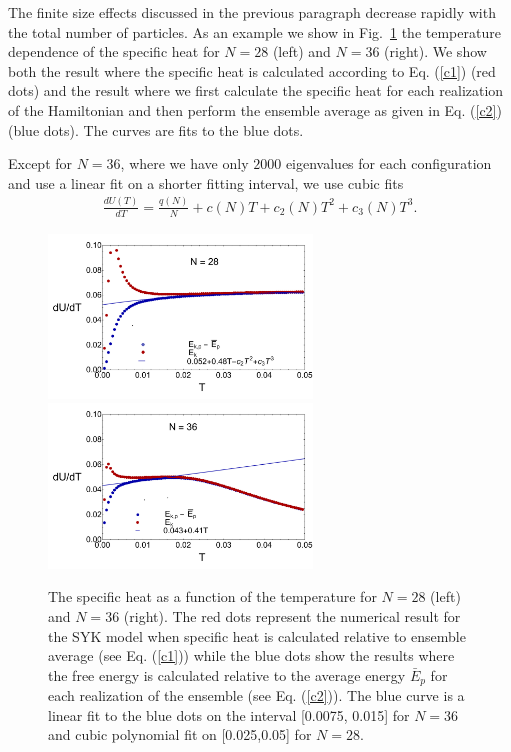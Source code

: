 \documentclass[aps,showpacs,floatfix,superscriptaddress,pre,11pt]{revtex4-1}
\newcommand{\eref}[1]{(\ref{#1})}
\newcommand{\be}{\begin{eqnarray}}
\newcommand{\ee}{\end{eqnarray}}
\begin{document}
   
 The finite size effects discussed in the previous paragraph decrease
 rapidly with the total number of particles. As an example we show
  in Fig.~\ref{zbet} the temperature dependence of the specific heat for $N = 28 $ (left) and
   $N=36$ (right). We show both the result where the specific heat
   is calculated according to Eq. \eref{c1}
   (red dots) and the result where we first calculate the specific
   heat for each realization of the Hamiltonian and then perform the ensemble
   average as given in Eq. \eref{c2} (blue dots).
   The curves are  fits to the blue dots. %
   
  

  Except for $N=36$, where we have only $2000$ eigenvalues
   for each configuration and  use a linear fit on a shorter fitting interval,  we use cubic fits
   \be \label{cn}
   \frac{dU(T)}{dT} = \frac {q(N)}N +c(N) T +c_2(N) T^2 + c_3(N) T^3. 
   \ee
 \begin{figure}[t!]
   	\centering
   	\includegraphics[width=7cm]{dudtn28ant.pdf}
   	\includegraphics[width=7cm]{dudtn36ant.pdf}
   	\caption{The specific heat as a function of the temperature for $N=28$ (left) and $N=36$ (right).
   	  The red dots represent the numerical result for the SYK model when
          specific heat is calculated relative to ensemble average
          (see Eq. \eref{c1}) while the blue dots show the results where
          the free energy is calculated
          relative to the average energy $\bar E_p$ for each
          realization of the ensemble (see Eq. \eref{c2}).
 The blue curve is a linear fit to
   		the blue dots on the interval [0.0075, 0.015] for $N=36$ and cubic polynomial fit on [0.025,0.05] for $N=28$.}
   	\label{zbet}
   \end{figure}
   
\end{document}
